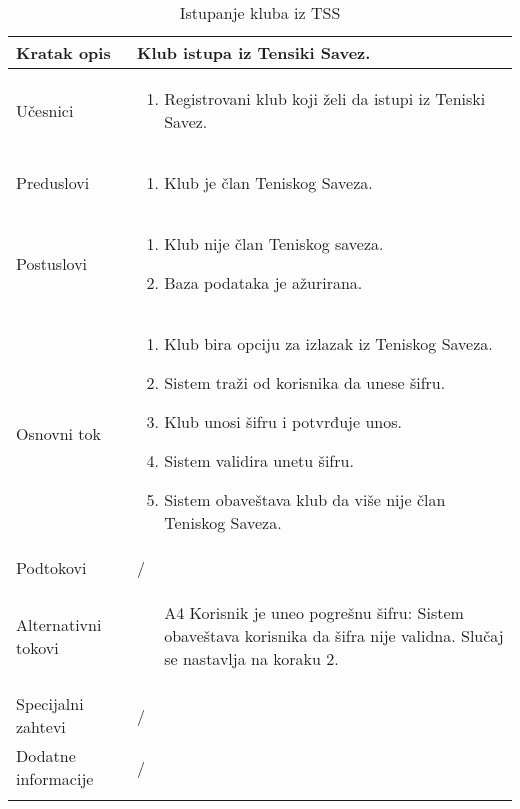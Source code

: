 \documentclass{article}
\begin{document}
\begin{longtable}{| p{} | p{} |} 
\hline
    Kratak opis & Klub istupa iz Tensiki Savez.\\ 
\hline    
    Učesnici & \begin{enumerate}
        \item Registrovani klub koji želi da istupi iz Teniski Savez.
    \end{enumerate}
         
    \\
\hline
   Preduslovi & \begin{enumerate}
       \item Klub je član Teniskog Saveza.
   \end{enumerate}\\
\hline  
    Postuslovi & \begin{enumerate}
        \item Klub nije član Teniskog saveza.
        \item Baza podataka je ažurirana.
    \end{enumerate}\\
\hline
    Osnovni tok & \begin{enumerate}
        \item Klub bira opciju za izlazak iz Teniskog Saveza.
        \item Sistem traži od korisnika da unese šifru.
        \item Klub unosi šifru i potvrđuje unos.
        \item Sistem validira unetu šifru.
        \item Sistem obaveštava klub da više nije član Teniskog Saveza.
    \end{enumerate}
    \\

\hline
    Podtokovi &  /\\
  \hline  
    Alternativni tokovi & \begin{enumerate}
            \item[A4] Korisnik je uneo pogrešnu šifru: Sistem obaveštava korisnika da šifra nije validna. Slučaj se nastavlja na koraku 2.
        \end{enumerate}\\


\hline
    Specijalni zahtevi & /\\
\hline
    Dodatne informacije & /\\
\hline
  
\caption{Istupanje kluba iz TSS} 

\end{longtable}
\end{document}
